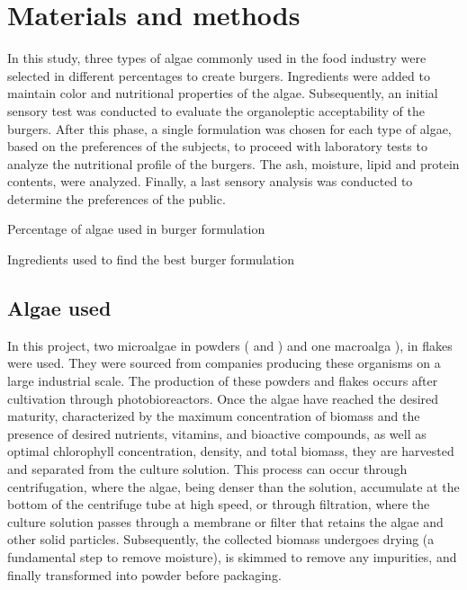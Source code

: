 
\section{Materials and methods}
In this study, three types of algae commonly used in the food industry were selected in different percentages  to create burgers. Ingredients  were added to maintain color and nutritional properties of the algae. Subsequently, an initial sensory test was conducted to evaluate the organoleptic acceptability of the burgers. After this phase, a single formulation was chosen for each type of algae, based on the preferences of the subjects, to proceed with laboratory tests to analyze the nutritional profile of the burgers. The ash, moisture, lipid and protein contents\zxriv{}, were analyzed. Finally, a last sensory analysis was conducted to determine the preferences of the public.

\begin{table}[H]
	\centering
	
	\caption{Percentage of algae used in burger formulation}
	\label{tab:algae_percentages}
\end{table}

\begin{table}[H]
	\centering
	
	\caption{Ingredients used to find the best burger formulation}
	\label{tab:ingredients}
\end{table}


\subsection{Algae used}
In this project, two microalgae in powders ( and ) and one macroalga ), in flakes were used. They were sourced from companies producing these organisms on a large industrial scale. The production of these powders and flakes occurs after cultivation through photobioreactors. Once the algae have reached the desired maturity, characterized by the maximum concentration of biomass and the presence of desired nutrients, vitamins, and bioactive compounds, as well as optimal chlorophyll concentration, density, and total biomass, they are harvested and separated from the culture solution. This process can occur through centrifugation, where the algae, being denser than the solution, accumulate at the bottom of the centrifuge tube at high speed, or through filtration, where the culture solution passes through a membrane or filter that retains the algae and other solid particles. Subsequently, the collected biomass undergoes drying (a fundamental step to remove moisture), is skimmed to remove any impurities, and finally transformed into powder before packaging.


